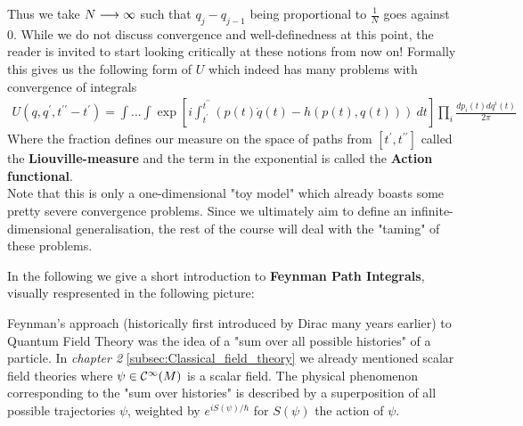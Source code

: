 \begin{example}
  Thus we take $N\longrightarrow \infty$ such that $q_j - q_{j-1}$ being proportional to $\frac{1}{N}$ goes against $0$. While we do not discuss convergence and well-definedness at this point, the reader is invited to start looking critically at these notions from now on! Formally this gives us the following form of $U$ which indeed has many problems with convergence of integrals
  \begin{align}
    U(q,q^\prime, t^{\prime\prime}-t^\prime) = \int ... \int  \exp\left[i\int_{t^\prime}^{t^{\prime\prime}}( p(t)\dot q(t) - h(p(t),q(t)))\ dt \right] \prod_i \frac{dp_i(t) dq^i(t)}{2\pi}
  \end{align}
  Where the fraction defines our measure on the space of paths from $[t^\prime, t^{\prime\prime}]$ called the \textbf{Liouville-measure} and the term in the exponential is called the \textbf{Action functional}.\\

  Note that this is only a one-dimensional "toy model" which already boasts some pretty severe convergence problems. Since we ultimately aim to define an infinite-dimensional generalisation, the rest of the course will deal with the "taming" of these problems.
\end{example}

In the following we give a short introduction to \textbf{Feynman Path Integrals}, visually respresented in the following picture:
\begin{center}
\end{center}
Feynman's approach (historically first introduced by Dirac many years earlier) to Quantum Field Theory was the idea of a "sum over all possible histories" of a particle. In \emph{chapter 2} \ref{subsec:Classical_field_theory} we already mentioned scalar field theories where $\psi \in\mathcal{C}^{\infty}(M)$ is a scalar field. The physical phenomenon corresponding to the "sum over histories" is described by a superposition of all possible trajectories $\psi$, weighted by $e^{iS(\psi) / \hbar}$ for $S(\psi)$ the action of $\psi$.\\

